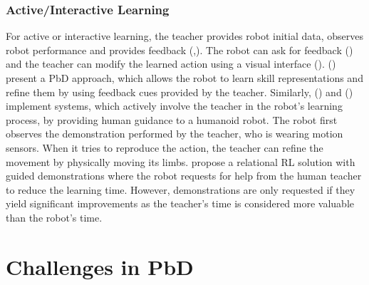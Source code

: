 \subsubsection{Active/Interactive Learning}\label{sssec:Active Learning} 
For active or interactive learning, the teacher provides robot initial data, observes robot performance and provides feedback (\cite{chernova2014robot},\cite{calinon2007active}).
The robot can ask for feedback (\cite{cakmak2012aaai}) and the teacher can modify the learned action using a visual interface (\cite{alexandrova2015roboflow}).
(\cite{nicolescu2003natural}) present a PbD approach, which allows the robot to learn skill representations and refine them by using feedback cues provided by the teacher.
Similarly, (\cite{calinon2007active}) and (\cite{calinon2007incremental}) implement systems, which actively involve the teacher in the robot's learning process, by providing human guidance to a humanoid robot. 
The robot first observes the demonstration performed by the teacher, who is wearing motion sensors. When it tries to reproduce the action, the teacher can refine the movement by physically moving its limbs.
\cite{martinez2017relational} propose a relational RL solution with guided demonstrations where the robot requests for help from the human teacher to reduce the learning time.
However, demonstrations are only requested if they yield significant improvements as the teacher's time is considered more valuable than the robot's time.




\section{Challenges in PbD}\label{sssec:Challenges in PbD}

